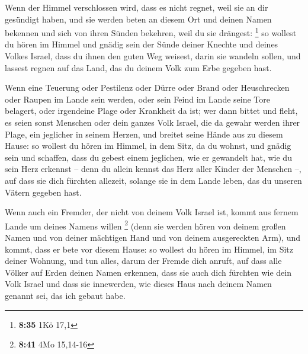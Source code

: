  Wenn der Himmel verschlossen wird, dass es nicht regnet,
weil sie an dir gesündigt haben, und sie werden beten an diesem Ort und
deinen Namen bekennen und sich von ihren Sünden bekehren, weil du sie
drängest: \footnote{\textbf{8:35} 1Kö 17,1}  so wollest
du hören im Himmel und gnädig sein der Sünde deiner Knechte und deines
Volkes Israel, dass du ihnen den guten Weg weisest, darin sie wandeln
sollen, und lassest regnen auf das Land, das du deinem Volk zum Erbe
gegeben hast.

 Wenn eine Teuerung oder Pestilenz oder Dürre oder Brand
oder Heuschrecken oder Raupen im Lande sein werden, oder sein Feind im
Lande seine Tore belagert, oder irgendeine Plage oder Krankheit da ist;
 wer dann bittet und fleht, es seien sonst Menschen oder
dein ganzes Volk Israel, die da gewahr werden ihrer Plage, ein jeglicher
in seinem Herzen, und breitet seine Hände aus zu diesem Hause:
 so wollest du hören im Himmel, in dem Sitz, da du
wohnst, und gnädig sein und schaffen, dass du gebest einem jeglichen,
wie er gewandelt hat, wie du sein Herz erkennst -- denn du allein kennst
das Herz aller Kinder der Menschen --,  auf dass sie dich
fürchten allezeit, solange sie in dem Lande leben, das du unseren Vätern
gegeben hast.

 Wenn auch ein Fremder, der nicht von deinem Volk Israel
ist, kommt aus fernem Lande um deines Namens willen \footnote{\textbf{8:41}
  4Mo 15,14-16}  (denn sie werden hören von deinem großen
Namen und von deiner mächtigen Hand und von deinem ausgereckten Arm),
und kommt, dass er bete vor diesem Hause:  so wollest du
hören im Himmel, im Sitz deiner Wohnung, und tun alles, darum der Fremde
dich anruft, auf dass alle Völker auf Erden deinen Namen erkennen, dass
sie auch dich fürchten wie dein Volk Israel und dass sie innewerden, wie
dieses Haus nach deinem Namen genannt sei, das ich gebaut habe.

